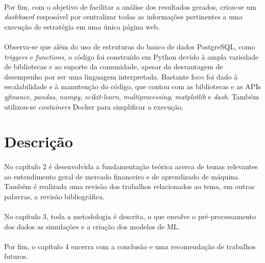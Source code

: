\paragraph{} Por fim, com o objetivo de facilitar a análise dos resultados gerados, criou-se um \textit{dashboard} resposável por centralizar todas as informações pertinentes a uma execução de estratégia em uma única página web.

\paragraph{} Observa-se que além do uso de estruturas do banco de dados PostgreSQL, como \textit{triggers} e \textit{functions}, o código foi construído em Python devido à ampla variedade de bibliotecas e ao suporte da comunidade, apesar da desvantagem de desempenho por ser uma linguagem interpretada. Bastante foco foi dado à escalabilidade e à manutenção do código, que contou com as bibliotecas e as APIs \textit{yfinance}, \textit{pandas}, \textit{numpy}, \textit{scikit-learn}, \textit{multiprocessing}, \textit{matplotlib} e \textit{dash}. Também utilizou-se \textit{containers} Docker para simplificar a execução.




\section{Descrição}

\paragraph{} No capítulo 2 é desenvolvida a fundamentação teórica acerca de temas relevantes ao entendimento geral de mercado financeiro e de aprendizado de máquina. Também é realizada uma revisão dos trabalhos relacionados ao tema, em outras palavras, a revisão bibliográfica.

\paragraph{} No capítulo 3, toda a metodologia é descrita, o que envolve o pré-processamento dos dados as simulações e a criação dos modelos de ML.

\paragraph{} Por fim, o capítulo 4 encerra com a conclusão e uma recomendação de trabalhos futuros.